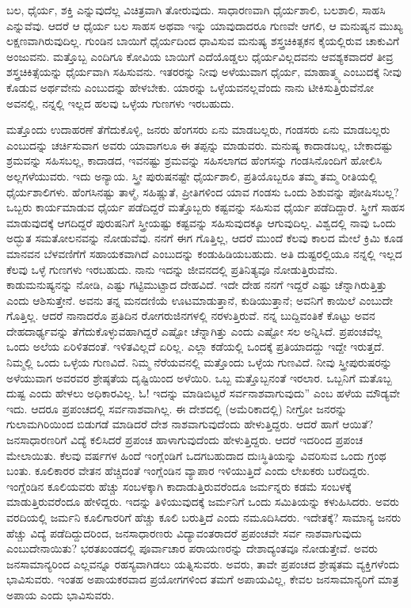 ಬಲ, ಧೈರ್ಯ, ಶಕ್ತಿ ಎನ್ನುವುದೆಲ್ಲ ವಿಚಿತ್ರವಾಗಿ ತೋರುವುದು. ಸಾಧಾರಣವಾಗಿ ಧೈರ್ಯಶಾಲಿ, ಬಲಶಾಲಿ, ಸಾಹಸಿ ಎನ್ನುವೆವು. ಆದರೆ ಆ ಧೈರ್ಯ ಬಲ ಸಾಹಸ ಅಥವಾ ಇನ್ನು ಯಾವುದಾದರೂ ಗುಣವೇ ಆಗಲಿ, ಆ ಮನುಷ್ಯನ ಮುಖ್ಯ ಲಕ್ಷಣವಾಗಿರುವುದಿಲ್ಲ. ಗುಂಡಿನ ಬಾಯಿಗೆ ಧೈರ್ಯದಿಂದ ಧಾವಿಸುವ ಮನುಷ್ಯ ಶಸ್ತ್ರಚಿಕಿತ್ಸಕನ ಕೈಯಲ್ಲಿರುವ ಚಾಕುವಿಗೆ ಅಂಜುವನು. ಮತ್ತೊಬ್ಬ ಎಂದಿಗೂ ಕೋವಿಯ ಬಾಯಿಗೆ ಎದೆಯೊಡ್ಡಲು ಧೈರ್ಯವಿಲ್ಲದವನು ಆವಶ್ಯಕವಾದರೆ ತೀವ್ರ ಶಸ್ತ್ರಚಿಕಿತ್ಸೆಯನ್ನು ಧೈರ್ಯವಾಗಿ ಸಹಿಸುವನು. ಇತರರನ್ನು ನೀವು ಅಳೆಯುವಾಗ ಧೈರ್ಯ, ಮಾಹಾತ್ಮ್ಯ ಎಂಬುದಕ್ಕೆ ನೀವು ಕೊಡುವ ಅರ್ಥವೇನು ಎಂಬುದನ್ನು ಹೇಳಬೇಕು. ಯಾರನ್ನು ಒಳ್ಳೆಯವನಲ್ಲವೆಂದು ನಾನು ಟೀಕಿಸುತ್ತಿರುವೆನೋ ಅವನಲ್ಲಿ, ನನ್ನಲ್ಲಿ ಇಲ್ಲದ ಹಲವು ಒಳ್ಳೆಯ ಗುಣಗಳು ಇರಬಹುದು.

ಮತ್ತೊಂದು ಉದಾಹರಣೆ ತೆಗೆದುಕೊಳ್ಳಿ, ಜನರು ಹೆಂಗಸರು ಏನು ಮಾಡಬಲ್ಲರು, ಗಂಡಸರು ಏನು ಮಾಡಬಲ್ಲರು ಎಂಬುದನ್ನು ಚರ್ಚಿಸುವಾಗ ಅವರು ಯಾವಾಗಲೂ ಈ ತಪ್ಪನ್ನು ಮಾಡುವರು. ಮನುಷ್ಯ ಕಾದಾಡಬಲ್ಲ, ಬೇಕಾದಷ್ಟು ಶ್ರಮವನ್ನು ಸಹಿಸಬಲ್ಲ, ಕಾದಾಡದ, ಇವನಷ್ಟು ಶ್ರಮವನ್ನು ಸಹಿಸಲಾಗದ ಹೆಂಗಸನ್ನು ಗಂಡಸಿನೊಂದಿಗೆ ಹೋಲಿಸಿ ಅಲ್ಲಗಳೆಯುವರು. ಇದು ಅನ್ಯಾಯ. ಸ್ತ್ರೀ ಪುರುಷನಷ್ಟೇ ಧೈರ್ಯಶಾಲಿ, ಪ್ರತಿಯೊಬ್ಬರೂ ತಮ್ಮ ತಮ್ಮ ರೀತಿಯಲ್ಲಿ ಧೈರ್ಯಶಾಲಿಗಳು. ಹೆಂಗಸಿನಷ್ಟು ತಾಳ್ಮೆ, ಸಹಿಷ್ಣುತೆ, ಪ್ರೀತಿಗಳಿಂದ ಯಾವ ಗಂಡಸು ಒಂದು ಶಿಶುವನ್ನು ಪೋಷಿಸಬಲ್ಲ? ಒಬ್ಬರು ಕಾರ್ಯಮಾಡುವ ಧೈರ್ಯ ಪಡೆದಿದ್ದರೆ ಮತ್ತೊಬ್ಬರು ಕಷ್ಟವನ್ನು ಸಹಿಸುವ ಧೈರ್ಯ ಪಡೆದಿದ್ದಾರೆ. ಸ್ತ್ರೀಗೆ ಸಾಹಸ ಮಾಡುವುದಕ್ಕೆ ಆಗದಿದ್ದರೆ ಪುರುಷನಿಗೆ ಸ್ತ್ರೀಯಷ್ಟು ಕಷ್ಟವನ್ನು ಸಹಿಸುವುದಕ್ಕೂ ಆಗುವುದಿಲ್ಲ. ವಿಶ್ವದಲ್ಲಿ ನಾವು ಒಂದು ಅದ್ಭುತ ಸಮತೋಲನವನ್ನು ನೋಡುವೆವು. ನನಗೆ ಈಗ ಗೊತ್ತಿಲ್ಲ, ಆದರೆ ಮುಂದೆ ಕೆಲವು ಕಾಲದ ಮೇಲೆ ಕ್ರಿಮಿ ಕೂಡ ಮಾನವನ ಬೆಳವಣಿಗೆಗೆ ಸಹಾಯಕವಾಗಿದೆ ಎಂಬುದನ್ನು ಕಂಡುಹಿಡಿಯಬಹುದು. ಅತಿ ದುಷ್ಟರಲ್ಲಿಯೂ ನನ್ನಲ್ಲಿ ಇಲ್ಲದ ಕೆಲವು ಒಳ್ಳೆ ಗುಣಗಳು ಇರಬಹುದು. ನಾನು ಇದನ್ನು ಜೀವನದಲ್ಲಿ ಪ್ರತಿನಿತ್ಯವೂ ನೋಡುತ್ತಿರುವೆನು. ಕಾಡುಮನುಷ್ಯನನ್ನು ನೋಡಿ, ಎಷ್ಟು ಗಟ್ಟಿಮುಟ್ಟಾದ ದೇಹವಿದೆ. ಇದೇ ದೇಹ ನನಗೆ ಇದ್ದರೆ ಎಷ್ಟು ಚೆನ್ನಾಗಿರುತ್ತಿತ್ತು ಎಂದು ಆಶಿಸುತ್ತೇನೆ. ಅವನು ತನ್ನ ಮನದಣಿಯೆ ಊಟಮಾಡುತ್ತಾನೆ, ಕುಡಿಯುತ್ತಾನೆ; ಅವನಿಗೆ ಕಾಯಿಲೆ ಎಂಬುದೇ ಗೊತ್ತಿಲ್ಲ. ಆದರೆ ನಾನಾದರೊ ಪ್ರತಿದಿನ ರೋಗರುಜಿನಗಳಲ್ಲಿ ನರಳುತ್ತಿರುವೆ. ನನ್ನ ಬುದ್ದಿವಂತಿಕೆ ಕೊಟ್ಟು ಅವನ ದೇಹದಾರ್ಢ್ಯವನ್ನು ತೆಗೆದುಕೊಳ್ಳುವಹಾಗಿದ್ದರೆ ಎಷ್ಟೋ ಚೆನ್ನಾಗಿತ್ತು ಎಂದು ಎಷ್ಟೋ ಸಲ ಅನ್ನಿಸಿದೆ. ಪ್ರಪಂಚವೆಲ್ಲ ಒಂದು ಅಲೆಯ ಏರಿಳಿತದಂತೆ. ಇಳಿತವಿಲ್ಲದೆ ಏರಿಲ್ಲ. ಎಲ್ಲಾ ಕಡೆಯಲ್ಲಿ ಒಂದಕ್ಕೆ ಪ್ರತಿಯಾದದ್ದು ಇದ್ದೇ ಇರುತ್ತದೆ. ನಿಮ್ಮಲ್ಲಿ ಒಂದು ಒಳ್ಳೆಯ ಗುಣವಿದೆ. ನಿಮ್ಮ ನೆರೆಯವನಲ್ಲಿ ಮತ್ತೊಂದು ಒಳ್ಳೆಯ ಗುಣವಿದೆ. ನೀವು ಸ್ತ್ರೀಪುರುಷರನ್ನು ಅಳೆಯುವಾಗ ಅವರವರ ಶ್ರೇಷ್ಠತೆಯ ದೃಷ್ಟಿಯಿಂದ ಅಳೆಯಿರಿ. ಒಬ್ಬ ಮತ್ತೊಬ್ಬನಂತೆ ಇರಲಾರ. ಒಬ್ಬನಿಗೆ ಮತೊಬ್ಬ ದುಷ್ಟ ಎಂದು ಹೇಳಲು ಅಧಿಕಾರವಿಲ್ಲ. ಓ! ಇದನ್ನು ಮಾಡಿಬಿಟ್ಟರೆ ಸರ್ವನಾಶವಾಗುವುದು'' ಎಂಬ ಹಳೆಯ ಮೌಡ್ಯವೇ ಇದು. ಆದರೂ ಪ್ರಪಂಚದಲ್ಲಿ ಸರ್ವನಾಶವಾಗಿಲ್ಲ. ಈ ದೇಶದಲ್ಲಿ (ಅಮೆರಿಕಾದಲ್ಲಿ) ನೀಗ್ರೋ ಜನರನ್ನು ಗುಲಾಮಗಿರಿಯಿಂದ ಬಿಡುಗಡೆ ಮಾಡಿದರೆ ದೇಶ ನಾಶವಾಗುವುದೆಂದು ಹೇಳುತ್ತಿದ್ದರು. ಆದರೆ ಹಾಗೆ ಆಯಿತೆ? ಜನಸಾಧಾರಣರಿಗೆ ವಿದ್ಯೆ ಕಲಿಸಿದರೆ ಪ್ರಪಂಚ ಹಾಳಾಗುವುದೆಂದು ಹೇಳುತ್ತಿದ್ದರು. ಆದರೆ ಇದರಿಂದ ಪ್ರಪಂಚ ಮೇಲಾಯಿತು. ಕೆಲವು ವರ್ಷಗಳ ಹಿಂದೆ ಇಂಗ್ಲೆಂಡಿಗೆ ಒದಗಬಹುದಾದ ದುಃಸ್ಥಿತಿಯನ್ನು ವಿವರಿಸುವ ಒಂದು ಗ್ರಂಥ ಬಂತು. ಕೂಲಿಕಾರರ ವೇತನ ಹೆಚ್ಚಿದಂತೆ ಇಂಗ್ಲೆಂಡಿನ ವ್ಯಾಪಾರ ಇಳಿಯುತ್ತಿದೆ ಎಂದು ಲೇಖಕರು ಬರೆದಿದ್ದರು. ಇಂಗ್ಲೆಂಡಿನ ಕೂಲಿಯವರು ಹೆಚ್ಚು ಸಂಬಳಕ್ಕಾಗಿ ಕಾದಾಡುತ್ತಿರುವರೆಂದೂ ಜರ್ಮನ್ನರು ಕಡಮೆ ಸಂಬಳಕ್ಕೆ ಮಾಡುತ್ತಿರುವರೆಂದೂ ಹೇಳಿದ್ದರು. ಇದನ್ನು ತಿಳಿಯುವುದಕ್ಕೆ ಜರ್ಮನಿಗೆ ಒಂದು ಸಮಿತಿಯನ್ನು ಕಳುಹಿಸಿದರು. ಅವರು ವರದಿಯಲ್ಲಿ ಜರ್ಮನಿ ಕೂಲಿಗಾರರಿಗೆ ಹೆಚ್ಚು ಕೂಲಿ ಬರುತ್ತಿದೆ ಎಂದು ನಮೂದಿಸಿದರು. ಇದೇತಕ್ಕೆ? ಸಾಮಾನ್ಯ ಜನರು ಹೆಚ್ಚು ವಿದ್ಯೆ ಪಡೆದಿದ್ದುದರಿಂದ, ಜನಸಾಧಾರಣರು ವಿದ್ಯಾವಂತರಾದರೆ ಪ್ರಪಂಚವೇ ಸರ್ವ ನಾಶವಾಗುವುದು ಎಂಬುದೇನಾಯಿತು? ಭರತಖಂಡದಲ್ಲಿ ಪೂರ್ವಾಚಾರ ಪರಾಯಣರನ್ನು ದೇಶಾದ್ಯಂತವೂ ನೋಡುತ್ತೇವೆ. ಅವರು ಜನಸಾಮಾನ್ಯರಿಂದ ಎಲ್ಲವನ್ನೂ ರಹಸ್ಯವಾಗಿಡಲು ಯತ್ನಿಸುವರು. ಅವರು, ತಾವೇ ಪ್ರಪಂಚದ ಶ್ರೇಷ್ಠತಮ ವ್ಯಕ್ತಿಗಳೆಂದು ಭಾವಿಸುವರು. ಇಂತಹ ಅಪಾಯಕರವಾದ ಪ್ರಯೋಗಗಳಿಂದ ತಮಗೆ ಅಪಾಯವಿಲ್ಲ, ಕೇವಲ ಜನಸಾಮಾನ್ಯರಿಗೆ ಮಾತ್ರ ಅಪಾಯ ಎಂದು ಭಾವಿಸುವರು.

